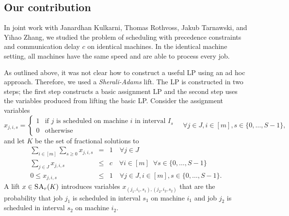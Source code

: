 \subsection{Our contribution}


In joint work with Janardhan Kulkarni, Thomas Rothvoss, Jakub Tarnawski, and Yihao Zhang, we studied the problem 
of scheduling with 
precedence constraints and communication delay $c$ on identical machines. 
In the identical machine setting, all machines have the same speed and are able to process every job. 

As outlined above, it was not clear how to construct a useful LP using an ad hoc approach.
Therefore, we used a \emph{Sherali-Adams} lift.
The LP is constructed in two steps; the first step constructs a basic assignment LP and the second step uses the variables produced from lifting the basic LP. %
Consider the assignment variables
\[
  x_{j,i,s} = \begin{cases} 1 & \textrm{if }j\textrm{ is scheduled on machine }i\textrm{ in interval }I_s \\ 0 & \textrm{otherwise} \end{cases} \quad \forall j \in J, i \in [m], s \in \{ 0,\ldots,S-1\},
\]
and let $K$ be the set of fractional solutions to 
\begin{eqnarray*}
  \sum_{i \in [m]} \sum_{s \geq 0} x_{j,i,s} &=& 1 \quad \forall j \in J \\
  \sum_{j \in J} x_{j,i,s} &\leq& c \quad \forall i \in [m] \;\; \forall s \in \{ 0,\ldots,S-1\} \\
  0 \leq x_{j,i,s} &\leq& 1 \quad \forall j \in J, i \in [m], s \in \{ 0,\ldots,S-1\}.
\end{eqnarray*}
A lift $x \in \textsc{SA}_r(K)$ introduces variables $x_{(j_1,i_1,s_1),(j_2,i_2,s_2)}$ that are the probability that 
job $j_1$ is scheduled in interval $s_1$ on machine $i_1$ and job
$j_2$ is scheduled in interval $s_2$ on machine $i_2$. 
